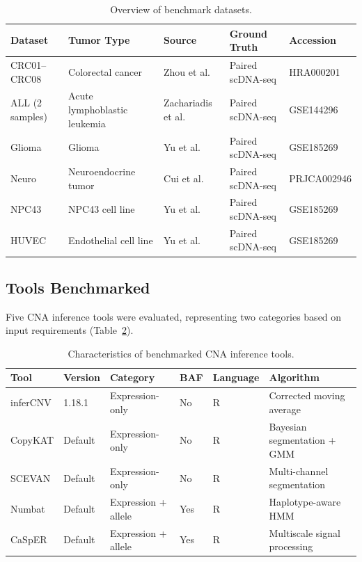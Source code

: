 \documentclass[11pt]{article}
\begin{document}
\begin{table}[H]
\centering
\caption{Overview of benchmark datasets.}
\label{tab:datasets}
\begin{tabular}{lllll}
\toprule
Dataset & Tumor Type & Source & Ground Truth & Accession \\
\midrule
CRC01--CRC08 & Colorectal cancer & Zhou et al. & Paired scDNA-seq & HRA000201 \\
ALL (2 samples) & Acute lymphoblastic leukemia & Zachariadis et al. & Paired scDNA-seq & GSE144296 \\
Glioma & Glioma & Yu et al. & Paired scDNA-seq & GSE185269 \\
Neuro & Neuroendocrine tumor & Cui et al. & Paired scDNA-seq & PRJCA002946 \\
NPC43 & NPC43 cell line & Yu et al. & Paired scDNA-seq & GSE185269 \\
HUVEC & Endothelial cell line & Yu et al. & Paired scDNA-seq & GSE185269 \\
\bottomrule
\end{tabular}
\end{table}

\subsection{Tools Benchmarked}

Five CNA inference tools were evaluated, representing two categories based on input requirements (Table~\ref{tab:tools}).

\begin{table}[H]
\centering
\caption{Characteristics of benchmarked CNA inference tools.}
\label{tab:tools}
\begin{tabular}{llllll}
\toprule
Tool & Version & Category & BAF & Language & Algorithm \\
\midrule
inferCNV & 1.18.1 & Expression-only & No & R & Corrected moving average \\
CopyKAT & Default & Expression-only & No & R & Bayesian segmentation + GMM \\
SCEVAN & Default & Expression-only & No & R & Multi-channel segmentation \\
Numbat & Default & Expression + allele & Yes & R & Haplotype-aware HMM \\
CaSpER & Default & Expression + allele & Yes & R & Multiscale signal processing \\
\bottomrule
\end{tabular}
\end{table}
\end{document}
